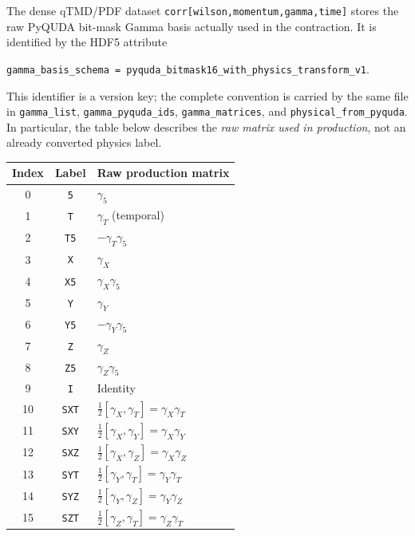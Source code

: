 \documentclass[11pt,a4paper]{article}
\begin{document}
The dense qTMD/PDF dataset
\texttt{corr[wilson,momentum,gamma,time]} stores the raw PyQUDA bit-mask
Gamma basis actually used in the contraction.  It is identified by the HDF5
attribute
\begin{center}
\texttt{gamma\_basis\_schema =
pyquda\_bitmask16\_with\_physics\_transform\_v1}.
\end{center}
This identifier is a version key; the complete convention is carried by the
same file in \texttt{gamma\_list}, \texttt{gamma\_pyquda\_ids},
\texttt{gamma\_matrices}, and \texttt{physical\_from\_pyquda}.  In
particular, the table below describes the \emph{raw matrix used in
production}, not an already converted physics label.

\begin{center}
\begin{tabular}{c|c|l}
\hline
\textbf{Index} & \textbf{Label} & \textbf{Raw production matrix} \\ \hline
0  & \texttt{5}   & $\gamma_5$ \\
1  & \texttt{T}   & $\gamma_T$ (temporal) \\
2  & \texttt{T5}  & $-\gamma_T\gamma_5$ \\
3  & \texttt{X}   & $\gamma_X$ \\
4  & \texttt{X5}  & $\gamma_X\gamma_5$ \\
5  & \texttt{Y}   & $\gamma_Y$ \\
6  & \texttt{Y5}  & $-\gamma_Y\gamma_5$ \\
7  & \texttt{Z}   & $\gamma_Z$ \\
8  & \texttt{Z5}  & $\gamma_Z\gamma_5$ \\
9  & \texttt{I}   & Identity \\
10 & \texttt{SXT} & $\frac{1}{2}[\gamma_X,\gamma_T]=\gamma_X\gamma_T$ \\
11 & \texttt{SXY} & $\frac{1}{2}[\gamma_X,\gamma_Y]=\gamma_X\gamma_Y$ \\
12 & \texttt{SXZ} & $\frac{1}{2}[\gamma_X,\gamma_Z]=\gamma_X\gamma_Z$ \\
13 & \texttt{SYT} & $\frac{1}{2}[\gamma_Y,\gamma_T]=\gamma_Y\gamma_T$ \\
14 & \texttt{SYZ} & $\frac{1}{2}[\gamma_Y,\gamma_Z]=\gamma_Y\gamma_Z$ \\
15 & \texttt{SZT} & $\frac{1}{2}[\gamma_Z,\gamma_T]=\gamma_Z\gamma_T$ \\
\hline
\end{tabular}
\end{center}
\end{document}
